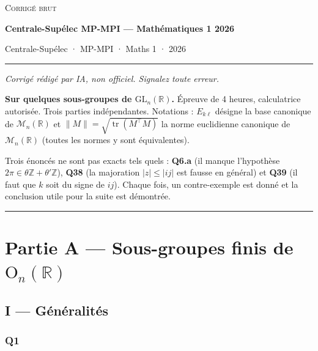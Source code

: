 \documentclass[11pt,a4paper]{article}
\begin{document}
\thispagestyle{plain}
\begin{center}
  {\small\scshape Corrigé brut}\par\smallskip
  {\LARGE\bfseries Centrale-Supélec MP-MPI — Mathématiques 1 2026\par}\medskip
  {\large Centrale-Supélec · MP-MPI · Maths 1 · 2026\par}
\end{center}
\vspace{2pt}\hrule\vspace{8pt}

\emph{Corrigé rédigé par IA, non officiel. Signalez toute erreur.}

\textbf{Sur quelques sous-groupes de \({\mathrm{GL}}_n(\mathbb{R})\).} Épreuve de 4 heures, calculatrice autorisée. Trois parties indépendantes. Notations : \(E_{k\ell}\) désigne la base canonique de \({\mathcal{M}}_n(\mathbb{R})\) et \(\|M\|=\sqrt{\operatorname{tr}(M^\top M)}\) la norme euclidienne canonique de \({\mathcal{M}}_n(\mathbb{R})\) (toutes les normes y sont équivalentes).

Trois énoncés ne sont pas exacts tels quels : \textbf{Q6.a} (il manque l'hypothèse \(2\pi\in\theta\mathbb{Z}+\theta'\mathbb{Z}\)), \textbf{Q38} (la majoration \(|z|\leqslant|ij|\) est fausse en général) et \textbf{Q39} (il faut que \(k\) soit du signe de \(ij\)). Chaque fois, un contre-exemple est donné et la conclusion utile pour la suite est démontrée.

\begin{center}\rule{0.5\linewidth}{0.5pt}\end{center}

\hypertarget{partie-a-sous-groupes-finis-de-mathrmo_nmathbbr}{%
\section{\texorpdfstring{Partie A --- Sous-groupes finis de \({\mathrm{O}}_n(\mathbb{R})\)}{Partie A --- Sous-groupes finis de \{\textbackslash mathrm\{O\}\}\_n(\textbackslash mathbb\{R\})}}\label{partie-a-sous-groupes-finis-de-mathrmo_nmathbbr}}

\hypertarget{i-guxe9nuxe9ralituxe9s}{%
\subsection{I --- Généralités}\label{i-guxe9nuxe9ralituxe9s}}

\hypertarget{q1}{%
\subsubsection{Q1}\label{q1}}
\end{document}
